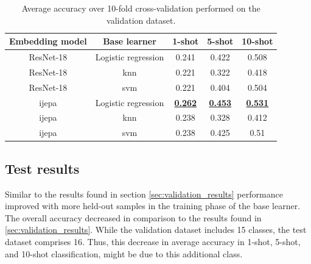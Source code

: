 \begin{table}[ht!]
\centering
\begin{tabular}{ c c c c c }
	\hline
	\textbf{Embedding model} & \textbf{Base learner} & \textbf{1-shot} & \textbf{5-shot} & \textbf{10-shot} \\
	\hline
	ResNet-18 & Logistic regression & 0.241 & 0.422 & 0.508 \\
	ResNet-18 & \gls{knn} & 0.221 & 0.322 & 0.418 \\
	ResNet-18 & \gls{svm} & 0.221 & 0.404 & 0.504 \\
	\hline
	\gls{ijepa} & Logistic regression & \underline{\textbf{0.262}} & \underline{\textbf{0.453}} & \underline{\textbf{0.531}} \\
	\gls{ijepa} & \gls{knn} & 0.238 & 0.328 & 0.412 \\
	\gls{ijepa} & \gls{svm} & 0.238 & 0.425 & 0.51 \\
	\hline
\end{tabular}
\caption{Average accuracy over 10-fold cross-validation performed on the validation dataset.}
\label{table:validation}
\end{table}

\subsection{Test results}
Similar to the results found in section \ref{sec:validation_results} performance improved with more 
held-out samples in the training phase of the base learner. The overall accuracy decreased in comparison
to the results found in \ref{sec:validation_results}. While the validation dataset includes
15 classes, the test dataset comprises 16. Thus, this decrease in average accuracy in 1-shot, 5-shot, 
and 10-shot classification, might be due to this additional class.

